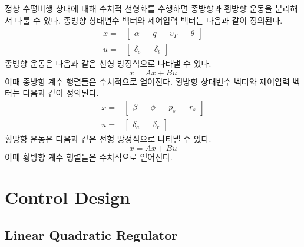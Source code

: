 \documentclass[a4paper, 12pt]{report}
\begin{document}
	정상 수평비행 상태에 대해 수치적 선형화를 수행하면 종방향과 횡방향 운동을 분리해서 다룰 수 있다.
	종방향 상태변수 벡터와 제어입력 벡터는 다음과 같이 정의된다.
	\begin{align}
		x =& \begin{bmatrix}
			\alpha && q && v_T && \theta
		\end{bmatrix} \\
		u =& \begin{bmatrix}
			\delta_e && \delta_t
		\end{bmatrix}
	\end{align}
	종방향 운동은 다음과 같은 선형 방정식으로 나타낼 수 있다.
	\begin{equation}
		x=Ax+Bu
	\end{equation}
	이때 종방향 계수 행렬들은 수치적으로 얻어진다.
	횡방향 상태변수 벡터와 제어입력 벡터는 다음과 같이 정의된다.
	\begin{align}
		x =& \begin{bmatrix}
			\beta && \phi && p_s && r_s
		\end{bmatrix} \\
		u =& \begin{bmatrix}
			\delta_a && \delta_r
		\end{bmatrix}
	\end{align}
	횡방향 운동은 다음과 같은 선형 방정식으로 나타낼 수 있다.
	\begin{equation}
		x=Ax+Bu
	\end{equation}
	이때 횡방향 계수 행렬들은 수치적으로 얻어진다.	
	\chapter{Control Design}
	
	\lipsum[8]
	
	\section{Linear Quadratic Regulator}
	
	\lipsum[9]
	
\end{document}
